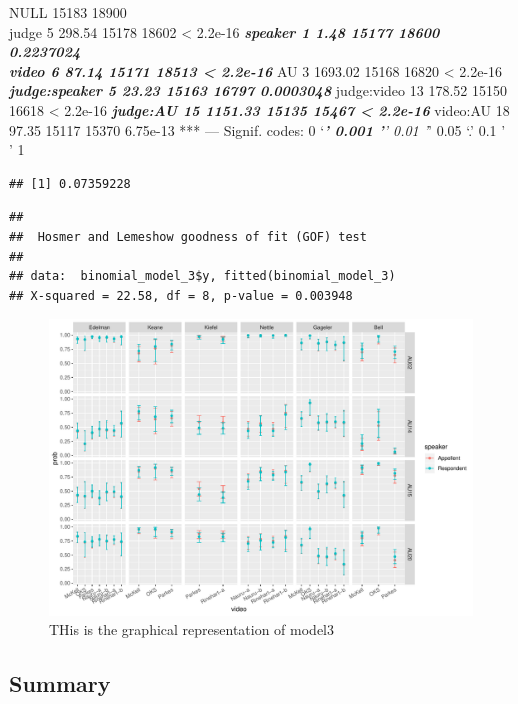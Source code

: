\documentclass{monashthesis}
\begin{document}
NULL 15183 18900\\
judge 5 298.54 15178 18602 \textless{} 2.2e-16 \textbf{\emph{
speaker 1 1.48 15177 18600 0.2237024\\
video 6 87.14 15171 18513 \textless{} 2.2e-16 }}
AU 3 1693.02 15168 16820 \textless{} 2.2e-16 \textbf{\emph{
judge:speaker 5 23.23 15163 16797 0.0003048 }}
judge:video 13 178.52 15150 16618 \textless{} 2.2e-16 \textbf{\emph{
judge:AU 15 1151.33 15135 15467 \textless{} 2.2e-16 }}
video:AU 18 97.35 15117 15370 6.75e-13 ***
---
Signif. codes: 0 `\emph{\textbf{' 0.001 '}' 0.01 '}' 0.05 `.' 0.1 ' ' 1

\begin{verbatim}
## [1] 0.07359228
\end{verbatim}

\begin{verbatim}
## 
##  Hosmer and Lemeshow goodness of fit (GOF) test
## 
## data:  binomial_model_3$y, fitted(binomial_model_3)
## X-squared = 22.58, df = 8, p-value = 0.003948
\end{verbatim}

\begin{figure}

{\centering \includegraphics[width=1\linewidth]{figures/unnamed-chunk-13-1} 

}

\caption{THis is the graphical representation of model3\label{fig:model_3_plot}}\label{fig:unnamed-chunk-13}
\end{figure}

\hypertarget{summary}{%
\subsection{Summary}\label{summary}}
\end{document}
